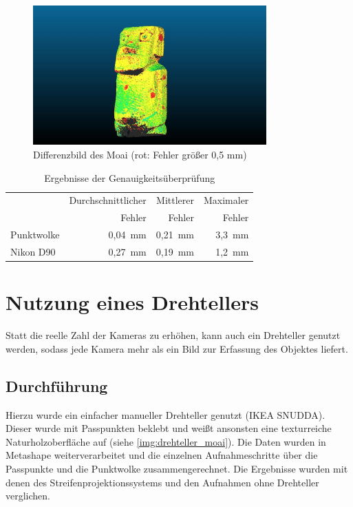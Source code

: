 \documentclass[./00PhotoBox.tex]{subfiles}
\begin{document}
\begin{figure}
    \centering
    \includegraphics[width=0.8\textwidth]{img/moai_fehler.jpg}
    \caption{Differenzbild des Moai (rot: Fehler größer 0,5 mm)}
    \label{img:differenz_moai}
\end{figure}

\begin{table}
    \centering
    \caption{Ergebnisse der Genauigkeitsüberprüfung}
    \label{tab:vergleich_erg}
    \begin{tabular}{l|r|r|r}
        \toprule
                   & Durchschnittlicher & Mittlerer & Maximaler \\
                   & Fehler             & Fehler    & Fehler    \\
        \midrule
        Punktwolke & 0,04~mm            & 0,21~mm   & 3,3~mm    \\  %
        \midrule
        Nikon D90  & 0,27~mm            & 0,19~mm   & 1,2~mm    \\
        \bottomrule
    \end{tabular}
\end{table}


\section{Nutzung eines Drehtellers}
\label{s:drehteller}
Statt die reelle Zahl der Kameras zu erhöhen, kann auch ein Drehteller genutzt werden, sodass jede Kamera mehr als ein Bild zur Erfassung des Objektes liefert.

\subsection{Durchführung}
Hierzu wurde ein einfacher manueller Drehteller genutzt (IKEA SNUDDA). Dieser wurde mit Passpunkten beklebt und weißt ansonsten eine texturreiche Naturholzoberfläche auf (siehe \autoref{img:drehteller_moai}). Die Daten wurden in Metashape weiterverarbeitet und die einzelnen Aufnahmeschritte über die Passpunkte und die Punktwolke zusammengerechnet. Die Ergebnisse wurden mit denen des Streifenprojektionssystems und den Aufnahmen ohne Drehteller verglichen.
\end{document}
